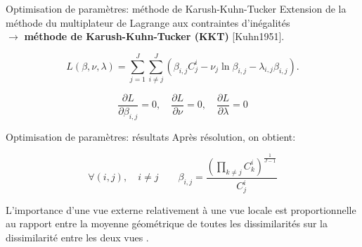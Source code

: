 \documentclass[hyperref={pdfpagelabels=false}]{beamer}
\begin{document}
    \begin{frame}{Optimisation de paramètres: méthode de Karush-Kuhn-Tucker}
        Extension de la méthode du multiplateur de Lagrange aux contraintes 
        d'inégalités\\
        $\rightarrow$ \textbf{méthode de Karush-Kuhn-Tucker (KKT)} [Kuhn1951]. 

        \begin{equation*}
        L(\beta,\nu,\lambda)=\sum_{j=1}^J  \sum_{i \neq j}^J ( \beta_{i,j}  C_j^i
        - \nu_j  \ln  \beta_{i,j}  - \lambda_{i,j}   \beta_{i,j} ).
        \end{equation*}

        \begin{equation*}
            \frac{\partial L}{\partial \beta_{i,j}} = 0,
            \quad
            \frac{\partial L}{\partial \nu} = 0,
            \quad
            \frac{\partial L}{\partial \lambda} = 0
        \end{equation*}
    \end{frame}
    
    \begin{frame}{Optimisation de paramètres: résultats}
        Après résolution, on obtient:

        \vspace{0.6cm}

        \begin{equation*}
            \forall (i,j), \quad i\neq j \qquad \beta_{i,j} =  
            \frac{(\prod_{k\neq j} C_k^i)^{\frac 
            1 {J-1}}}{C_j^i}
        \end{equation*} 

        \vspace{1cm}
        L'importance d'une vue externe relativement à une vue locale est
        proportionnelle au rapport entre la moyenne géométrique de toutes les
        dissimilarités sur la dissimilarité entre les deux vues
        .\\
    \end{frame}
\end{document}
